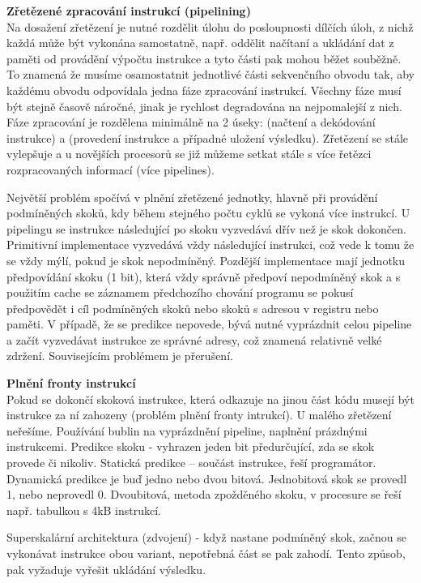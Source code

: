 \textbf{Zřetězené zpracování instrukcí (pipelining)} \\
Na dosažení zřetězení je nutné rozdělit úlohu do posloupnosti dílčích úloh, z nichž každá může být vykonána samostatně, např. oddělit načítaní a ukládání dat z paměti od provádění výpočtu instrukce a tyto části pak mohou běžet souběžně.  
To znamená že musíme osamostatnit jednotlivé části sekvenčního obvodu tak, aby každému obvodu odpovídala jedna fáze zpracování instrukcí. Všechny fáze musí být stejně časově náročné, jinak je rychlost degradována na nejpomalejší z nich. Fáze zpracování je rozdělena minimálně na 2 úseky: (načtení a dekódování instrukce) a (provedení instrukce a případné uložení výsledku). Zřetězení se stále vylepšuje a u novějších procesorů se již můžeme setkat stále s více řetězci rozpracovaných informací (více pipelines).

Největší problém spočívá v plnění zřetězené jednotky, hlavně při provádění podmíněných skoků, kdy během stejného počtu cyklů se vykoná více instrukcí.
U pipelingu se instrukce následující po skoku vyzvedává dřív než je skok dokončen. Primitivní implementace vyzvedává vždy následující instrukci, což vede k tomu že se vždy mýlí, pokud je skok nepodmíněný. Pozdější implementace mají jednotku předpovídání skoku (1 bit), která vždy správně předpoví nepodmíněný skok a s použitím cache se záznamem předchozího chování programu se pokusí předpovědět i cíl podmíněných skoků nebo skoků s adresou v registru nebo paměti.
V případě, že se predikce nepovede, bývá nutné vyprázdnit celou pipeline a začít vyzvedávat instrukce ze správné adresy, což znamená relativně velké zdržení. Souvisejícím problémem je přerušení.

\textbf{Plnění fronty instrukcí}\\
Pokud se dokončí skoková instrukce, která odkazuje na jinou část kódu musejí být instrukce za ní zahozeny (problém plnění fronty intrukcí). U malého zřetězení neřešíme.
Používání bublin na vyprázdnění pipeline, naplnění prázdnými instrukcemi. Predikce skoku - vyhrazen jeden bit předurčující, zda se skok provede či nikoliv.
Statická predikce -- součást instrukce, řeší programátor. Dynamická predikce je buď jedno nebo dvou bitová. Jednobitová skok se provedl 1, nebo neprovedl 0. Dvoubitová, metoda zpožděného skoku, v procesure se řeší např. tabulkou s 4kB instrukcí.

Superskalární architektura (zdvojení) - když nastane podmíněný skok, začnou se vykonávat instrukce obou variant, nepotřebná část se pak zahodí. Tento způsob, pak vyžaduje vyřešit ukládání výsledku.

